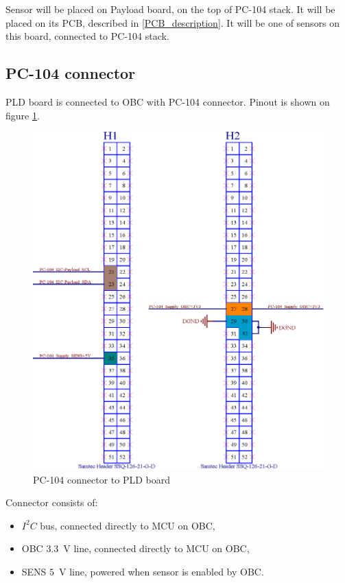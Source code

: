 	Sensor will be placed on Payload board, on the top of PC-104 stack. It will be placed on its PCB, described in \ref{PCB_description}. It will be one of sensors on this board, connected to PC-104 stack.
	
	
\subsection{PC-104 connector}
	PLD board is connected to OBC with PC-104 connector. Pinout is shown on figure \ref{PC104_PLD}.
	
	\begin{figure}[H]
		\centering
		\includegraphics[width=0.5\paperwidth]{img/PC-104.eps}
		\caption{PC-104 connector to PLD board}
		\label{PC104_PLD}
	\end{figure}

	Connector consists of:
	\begin{itemize}
		\item $I^2C$ bus, connected directly to MCU on OBC,
		\item OBC $3.3$~V line, connected directly to MCU on OBC,
		\item SENS $5$~V line, powered when sensor is enabled by OBC.
	\end{itemize}

